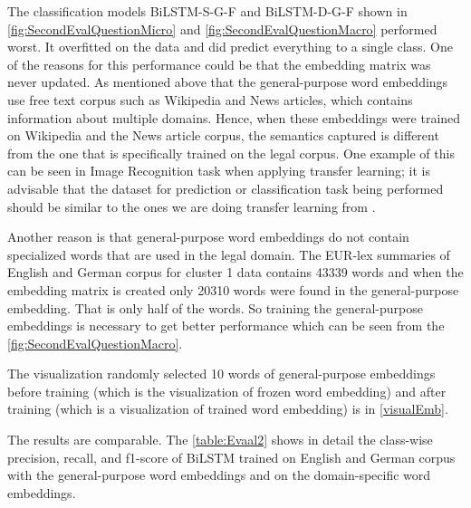 The classification models BiLSTM-S-G-F and BiLSTM-D-G-F shown in \ref{fig:SecondEvalQuestionMicro} and \ref{fig:SecondEvalQuestionMacro} performed worst. It overfitted on the data and did predict everything to a single class. One of the reasons for this performance could be that the embedding matrix was never updated. As mentioned above that the general-purpose word embeddings use free text corpus such as Wikipedia and News articles, which contains information about multiple domains. Hence, when these embeddings were trained on Wikipedia and the News article corpus, the semantics captured is different from the one that is specifically trained on the legal corpus. One example of this can be seen in Image Recognition task when applying transfer learning; it is advisable that the dataset for prediction or classification task being performed should be similar to the ones we are doing transfer learning from \cite{iglovikov2018ternausnet}.

Another reason is that general-purpose word embeddings do not contain specialized words that are used in the legal domain. The EUR-lex summaries of English and German corpus for cluster 1 data contains 43339 words and when the embedding matrix is created only 20310 words were found in the general-purpose embedding. That is only half of the words. So training the general-purpose embeddings is necessary to get better performance which can be seen from the \ref{fig:SecondEvalQuestionMacro}.

The visualization randomly selected 10 words of general-purpose embeddings before training (which is the visualization of frozen word embedding) and after training (which is a visualization of trained word embedding) is in \ref{visualEmb}. 

The results are comparable. The \ref{table:Evaal2} shows in detail the class-wise precision, recall, and f1-score of \gls{BiLSTM} trained on English and German corpus with the general-purpose word embeddings and on the domain-specific word embeddings.

